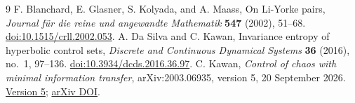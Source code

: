 \documentclass[11pt,a4paper]{article}
\theoremstyle{remark}
\begin{document}
\begin{thebibliography}{9}
F. Blanchard, E. Glasner, S. Kolyada, and A. Maass,
On Li-Yorke pairs, \emph{Journal f\"ur die reine und angewandte Mathematik}
\textbf{547} (2002), 51--68.
\href{https://doi.org/10.1515/crll.2002.053}{doi:10.1515/crll.2002.053}.
A. Da Silva and C. Kawan, Invariance entropy of hyperbolic control sets,
\emph{Discrete and Continuous Dynamical Systems} \textbf{36} (2016),
no.~1, 97--136.
\href{https://doi.org/10.3934/dcds.2016.36.97}{doi:10.3934/dcds.2016.36.97}.
C. Kawan, \emph{Control of chaos with minimal information transfer},
arXiv:2003.06935, version 5, 20 September 2026.
\href{https://arxiv.org/abs/2003.06935v5}{Version 5};
\href{https://doi.org/10.48550/arXiv.2003.06935}{arXiv DOI}.
\end{thebibliography}
\end{document}
